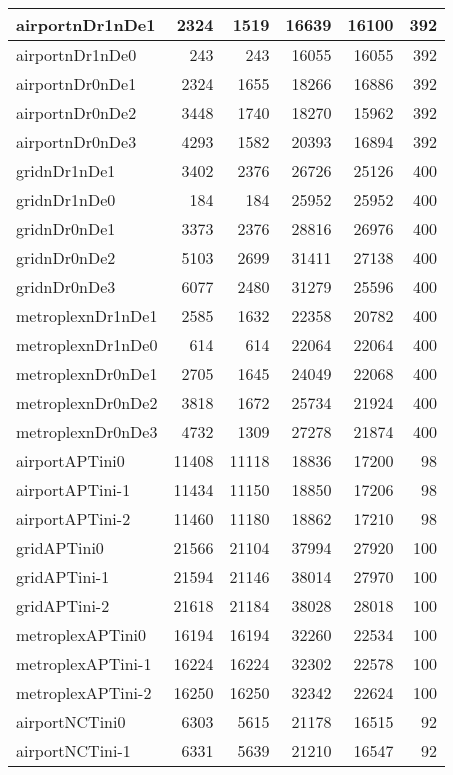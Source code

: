 \begin{longtable}{|l|r|r|r|r|r|}
\endlastfoot
airportnDr1nDe1 & 2324 & 1519 & 16639 & 16100 & 392 \\ \hline
airportnDr1nDe0 & 243 & 243 & 16055 & 16055 & 392 \\ \hline
airportnDr0nDe1 & 2324 & 1655 & 18266 & 16886 & 392 \\ \hline
airportnDr0nDe2 & 3448 & 1740 & 18270 & 15962 & 392 \\ \hline
airportnDr0nDe3 & 4293 & 1582 & 20393 & 16894 & 392 \\ \hline
gridnDr1nDe1 & 3402 & 2376 & 26726 & 25126 & 400 \\ \hline
gridnDr1nDe0 & 184 & 184 & 25952 & 25952 & 400 \\ \hline
gridnDr0nDe1 & 3373 & 2376 & 28816 & 26976 & 400 \\ \hline
gridnDr0nDe2 & 5103 & 2699 & 31411 & 27138 & 400 \\ \hline
gridnDr0nDe3 & 6077 & 2480 & 31279 & 25596 & 400 \\ \hline
metroplexnDr1nDe1 & 2585 & 1632 & 22358 & 20782 & 400 \\ \hline
metroplexnDr1nDe0 & 614 & 614 & 22064 & 22064 & 400 \\ \hline
metroplexnDr0nDe1 & 2705 & 1645 & 24049 & 22068 & 400 \\ \hline
metroplexnDr0nDe2 & 3818 & 1672 & 25734 & 21924 & 400 \\ \hline
metroplexnDr0nDe3 & 4732 & 1309 & 27278 & 21874 & 400 \\ \hline
airportAPTini0 & 11408 & 11118 & 18836 & 17200 & 98 \\ \hline
airportAPTini-1 & 11434 & 11150 & 18850 & 17206 & 98 \\ \hline
airportAPTini-2 & 11460 & 11180 & 18862 & 17210 & 98 \\ \hline
gridAPTini0 & 21566 & 21104 & 37994 & 27920 & 100 \\ \hline
gridAPTini-1 & 21594 & 21146 & 38014 & 27970 & 100 \\ \hline
gridAPTini-2 & 21618 & 21184 & 38028 & 28018 & 100 \\ \hline
metroplexAPTini0 & 16194 & 16194 & 32260 & 22534 & 100 \\ \hline
metroplexAPTini-1 & 16224 & 16224 & 32302 & 22578 & 100 \\ \hline
metroplexAPTini-2 & 16250 & 16250 & 32342 & 22624 & 100 \\ \hline
airportNCTini0 & 6303 & 5615 & 21178 & 16515 & 92 \\ \hline
airportNCTini-1 & 6331 & 5639 & 21210 & 16547 & 92 \\ \hline

\end{longtable}
